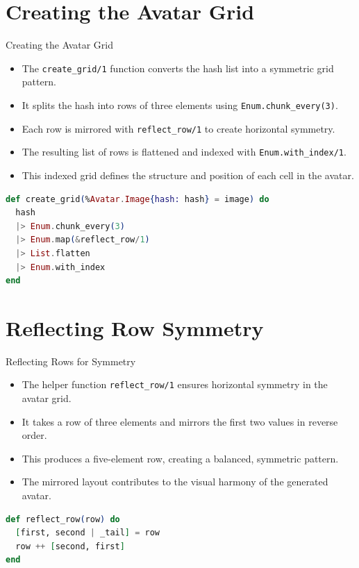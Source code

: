 \documentclass[aspectratio=169, table]{beamer}
\begin{document}
\section{Creating the Avatar Grid}
\begin{frame}[fragile]{Creating the Avatar Grid}
\vspace{20pt}
\begin{itemize}
  \item The \texttt{create\_grid/1} function converts the hash list into a symmetric grid pattern. 
	\item It splits the hash into rows of three elements using \texttt{Enum.chunk\_every(3)}.
  \item Each row is mirrored with \texttt{reflect\_row/1} to create horizontal symmetry.
  \item The resulting list of rows is flattened and indexed with \texttt{Enum.with\_index/1}. 
\item This indexed grid defines the structure and position of each cell in the avatar.
\end{itemize}

\begin{lstlisting}[language=Elixir, basicstyle=\ttfamily\small]
def create_grid(%Avatar.Image{hash: hash} = image) do
  hash
  |> Enum.chunk_every(3)
  |> Enum.map(&reflect_row/1)
  |> List.flatten
  |> Enum.with_index
end
\end{lstlisting}
\end{frame}

\section{Reflecting Row Symmetry}
\begin{frame}[fragile]{Reflecting Rows for Symmetry}
\small
\begin{itemize}
  \item The helper function \texttt{reflect\_row/1} ensures horizontal symmetry in the avatar grid.
  \item It takes a row of three elements and mirrors the first two values in reverse order.
  \item This produces a five-element row, creating a balanced, symmetric pattern.
  \item The mirrored layout contributes to the visual harmony of the generated avatar.
\end{itemize}

\begin{lstlisting}[language=Elixir, basicstyle=\ttfamily\small]
def reflect_row(row) do
  [first, second | _tail] = row
  row ++ [second, first]
end
\end{lstlisting}
\end{frame}
\end{document}
